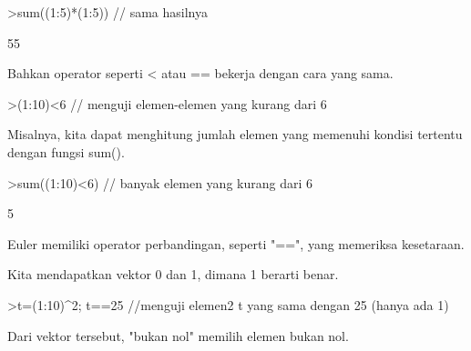 \begin{eulernotebook}
\begin{eulercomment}
\begin{eulercomment}
\begin{eulerprompt}
>sum((1:5)*(1:5)) // sama hasilnya
\end{eulerprompt}
\begin{euleroutput}
  55
\end{euleroutput}
\begin{eulercomment}
Bahkan operator seperti \textless{} atau == bekerja dengan cara yang sama.
\end{eulercomment}
\begin{eulerprompt}
>(1:10)<6 // menguji elemen-elemen yang kurang dari 6
\end{eulerprompt}
\begin{euleroutput}
  [1,  1,  1,  1,  1,  0,  0,  0,  0,  0]
\end{euleroutput}
\begin{eulercomment}
Misalnya, kita dapat menghitung jumlah elemen yang memenuhi kondisi
tertentu dengan fungsi sum().
\end{eulercomment}
\begin{eulerprompt}
>sum((1:10)<6) // banyak elemen yang kurang dari 6
\end{eulerprompt}
\begin{euleroutput}
  5
\end{euleroutput}
\begin{eulercomment}
Euler memiliki operator perbandingan, seperti "==", yang memeriksa
kesetaraan.

Kita mendapatkan vektor 0 dan 1, dimana 1 berarti benar.
\end{eulercomment}
\begin{eulerprompt}
>t=(1:10)^2; t==25 //menguji elemen2 t yang sama dengan 25 (hanya ada 1)
\end{eulerprompt}
\begin{euleroutput}
  [0,  0,  0,  0,  1,  0,  0,  0,  0,  0]
\end{euleroutput}
\begin{eulercomment}
Dari vektor tersebut, "bukan nol" memilih elemen bukan nol.


\end{eulercomment}
\end{eulercomment}
\end{eulercomment}
\end{eulernotebook}
